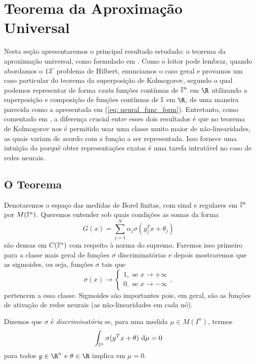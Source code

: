 
\section{Teorema da Aproximação Universal}

Nesta seção apresentaremos o principal resultado estudado: o teorema da aproximação universal, como formulado em \cite{cybenko89}.
Como o leitor pode lembrar, quando abordamos o \( 13^{ \circ } \) problema de Hilbert, enunciamos o caso geral e provamos um caso particular do teorema da superposição de Kolmogorov, segundo o qual podemos representar de forma \emph{exata} funções contínuas de \( \mathbb{I}^{ n } \) em \( \R \) utilizando a superposição e composição de funções contínuas de \( \mathbb{I} \) em \( \R \), de uma maneira parecida como a apresentada em (\ref{eq: neural_func_form}).
Entretanto, como comentado em \cite{cybenko89}, a diferença crucial entre esses dois resultados é que no teorema de Kolmogorov nos é permitido usar uma classe muito maior de não-linearidades, as quais variam de acordo com a função a ser representada.
Isso fornece uma intuição do porquê obter representações exatas é uma tarefa intratável no caso de redes neurais.

\subsection{O Teorema}

Denotaremos o espaço das medidas de Borel finitas, com sinal e regulares em \( \mathbb{I}^{ n } \) por \( M(\mathbb{I}^{ n }) \).
Queremos entender sob quais condições as somas da forma \[
    G(x) = \sum_{ j=1 }^{ N } \alpha_{ j } \sigma(y_{ j }^{ T }x + \theta_{ j })
\]
são densas em \( C(\mathbb{I}^{ n }) \) com respeito à norma do supremo.
Faremos isso primeiro para a classe mais geral de funções \( \sigma \) discriminatórias e depois mostraremos que as sigmoides, ou seja, funções \( \sigma \) tais que \[
    \sigma(x) \to
    \begin{cases}
        1, \text{ se } x \to +\infty \\
        0, \text{ se } x \to -\infty
    \end{cases}
,\]
pertencem a essa classe.
Sigmoides são importantes pois, em geral, são as funções de ativação de redes neurais (as não-linearidades em cada nó).

\begin{defn}
    Dizemos que \( \sigma \) é \emph{discriminatória} se, para uma medida \( \mu \in M(I^{ n }) \), termos \[
        \int_{ \mathbb{I}^{ n } } \sigma(y^{ T }x + \theta)  \ \mathrm{d}\mu = 0
    \]
    para todos \( y \in \R^{ n } \) e \( \theta \in \R \) implica em \( \mu = 0 \).
\end{defn}

